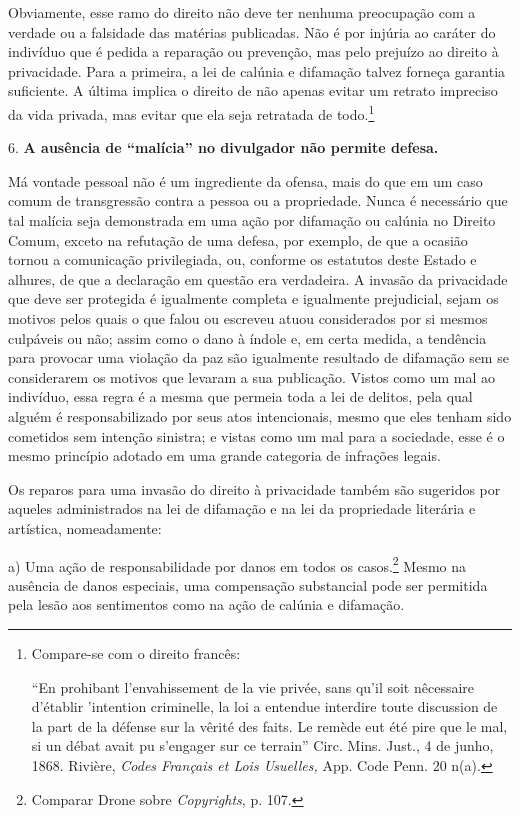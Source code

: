 Obviamente, esse ramo do direito não deve ter nenhuma preocupação com a
verdade ou a falsidade das matérias publicadas. Não é por injúria ao
caráter do indivíduo que é pedida a reparação ou prevenção, mas pelo
prejuízo ao direito à privacidade. Para a primeira, a lei de calúnia e
difamação talvez forneça garantia suficiente. A última implica o direito
de não apenas evitar um retrato impreciso da vida privada, mas evitar
que ela seja retratada de todo.\footnote{Compare-se com o direito
  francês:

  ``En prohibant l'envahissement de la vie privée, sans qu'il soit
  nêcessaire d'établir 'intention criminelle, la loi a entendue
  interdire toute discussion de la part de la défense sur la vêrité des
  faits. Le remède eut été pire que le mal, si un débat avait pu
  s'engager sur ce terrain'' Circ. Mins. Just., 4 de junho, 1868.
  Rivière, \emph{Codes Français et Lois Usuelles,} App. Code Penn. 20
  n(a).}

6. \textbf{A ausência de ``malícia'' no divulgador não permite defesa.}

Má vontade pessoal não é um ingrediente da ofensa, mais do que em um
caso comum de transgressão contra a pessoa ou a propriedade. Nunca é
necessário que tal malícia seja demonstrada em uma ação por difamação ou
calúnia no Direito Comum, exceto na refutação de uma defesa, por
exemplo, de que a ocasião tornou a comunicação privilegiada, ou,
conforme os estatutos deste Estado e alhures, de que a declaração em
questão era verdadeira. A invasão da privacidade que deve ser protegida
é igualmente completa e igualmente prejudicial, sejam os motivos pelos
quais o que falou ou escreveu atuou considerados por si mesmos culpáveis
ou não; assim como o dano à índole e, em certa medida, a tendência para
provocar uma violação da paz são igualmente resultado de difamação sem
se considerarem os motivos que levaram a sua publicação. Vistos como um
mal ao indivíduo, essa regra é a mesma que permeia toda a lei de
delitos, pela qual alguém é responsabilizado por seus atos intencionais,
mesmo que eles tenham sido cometidos sem intenção sinistra; e vistas
como um mal para a sociedade, esse é o mesmo princípio adotado em uma
grande categoria de infrações legais.

Os reparos para uma invasão do direito à privacidade também são
sugeridos por aqueles administrados na lei de difamação e na lei da
propriedade literária e artística, nomeadamente:

a) Uma ação de responsabilidade por danos em todos os casos.\footnote{Comparar
  Drone sobre \emph{Copyrights}, p. 107.} Mesmo na ausência de danos
especiais, uma compensação substancial pode ser permitida pela lesão aos
sentimentos como na ação de calúnia e difamação.

